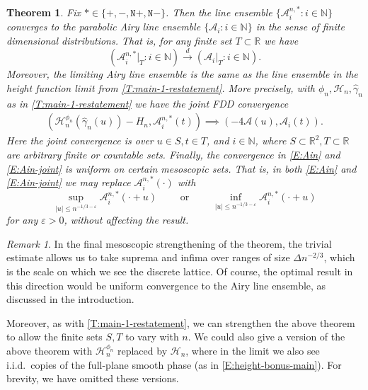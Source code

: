 \documentclass[11pt,twoside]{amsart}
\theoremstyle{plain}
\newtheorem{thm}{Theorem}[section]
\numberwithin{quest}{section}
\theoremstyle{remark}
\newtheorem{rem}{Remark}
\numberwithin{rem}{section}
\theoremstyle{definition}
\newcommand{\eps}{\varepsilon}
\newcommand{\N}{\mathbb{N}}
\newcommand{\R}{\mathbb{R}}
\newcommand{\cA}{\mathcal{A}}
\newcommand{\cH}{\mathcal{H}}
\newcommand{\cvgd}{\stackrel{d}{\to}}
\renewcommand{\tt}[1]{{\mathtt{#1}}}
\begin{document}
	
	\begin{thm}
		\label{T:main-2-restatement}
		Fix $\ast \in \{+, -, \tt{N}+, \tt{N}-\}$. Then the line ensemble $\{\cA_i^{n, *} : i \in \N\}$ converges to the parabolic Airy line ensemble $\{\cA_i : i \in \N\}$ in the sense of finite dimensional distributions. That is, for any finite set $T \subset \R$ we have
		\begin{equation}
			\label{E:Ain}
			(\cA_i^{n, *}|_T : i \in \N) \cvgd (\cA_i|_T : i \in \N).
		\end{equation}
		Moreover, the limiting Airy line ensemble is the same as the line ensemble in the height function limit from
		\cref{T:main-1-restatement}. More precisely, with $\phi_n, \cH_n, \hat \gamma_n$ as in \cref{T:main-1-restatement} we have the joint FDD convergence
		\begin{equation}
			\label{E:Ain-joint}
			\begin{split}
			(\cH_n^{\phi_n}(\hat \gamma_n(u)) - H_n, \cA_i^{n, *}(t)) \implies (-4 \cA(u), \cA_i(t)).
			\end{split}
		\end{equation}
	Here the joint convergence is over $u \in S, t \in T$, and $i \in \N$, where $S \subset \R^2, T \subset \R$ are arbitrary finite or countable sets. 
		Finally, the convergence in \eqref{E:Ain} and \eqref{E:Ain-joint} is uniform on certain \textit{mesoscopic} sets. That is, in both \eqref{E:Ain} and \eqref{E:Ain-joint} we may replace $\cA_i^{n, *}(\cdot)$ with 
			\begin{equation}
				\label{E:suppinf}
			\sup_{|u| \le n^{-1/3 - \eps}} \cA_i^{n, *}(\cdot + u) \qquad \text{ or } \qquad \inf_{|u| \le  n^{-1/3 - \eps}} \cA_i^{n, *}(\cdot + u)
			\end{equation}
			for any $\eps > 0$, without affecting the result.
	\end{thm}
	
	\begin{rem}
		In the final mesoscopic strengthening of the theorem, the trivial estimate allows us to take suprema and infima over ranges of size $\Delta n^{-2/3}$, which is the scale on which we see the discrete lattice. Of course, the optimal result in this direction would be uniform convergence to the Airy line ensemble, as discussed in the introduction.
		
		Moreover, as with \cref{T:main-1-restatement}, we can strengthen the above theorem to allow the finite sets $S, T$ to vary with $n$. We could also give a version of the above theorem with $\cH_n^{\phi_n}$ replaced by $\cH_n$, where in the limit we also see i.i.d.\ copies of the full-plane smooth phase (as in \eqref{E:height-bonus-main}). For brevity, we have omitted these versions.
		\end{rem}
	
\end{document}
